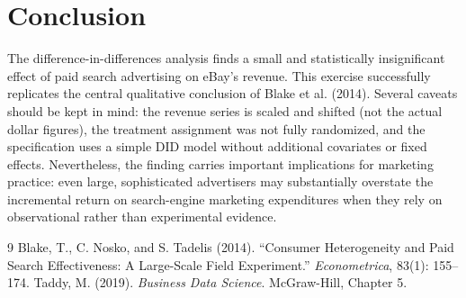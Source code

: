 \documentclass[12pt]{article}
\begin{document}
\section{Conclusion}
The difference-in-differences analysis finds a small and statistically insignificant effect of paid search advertising on eBay's revenue. This exercise successfully replicates the central qualitative conclusion of Blake et al. (2014). Several caveats should be kept in mind: the revenue series is scaled and shifted (not the actual dollar figures), the treatment assignment was not fully randomized, and the specification uses a simple DID model without additional covariates or fixed effects. Nevertheless, the finding carries important implications for marketing practice: even large, sophisticated advertisers may substantially overstate the incremental return on search-engine marketing expenditures when they rely on observational rather than experimental evidence.
\begin{thebibliography}{9}
Blake, T., C. Nosko, and S. Tadelis (2014).
``Consumer Heterogeneity and Paid Search Effectiveness: A Large-Scale Field Experiment.''
\textit{Econometrica}, 83(1): 155--174.
Taddy, M. (2019).
\textit{Business Data Science}. McGraw-Hill, Chapter 5.
\end{thebibliography}
\end{document}
